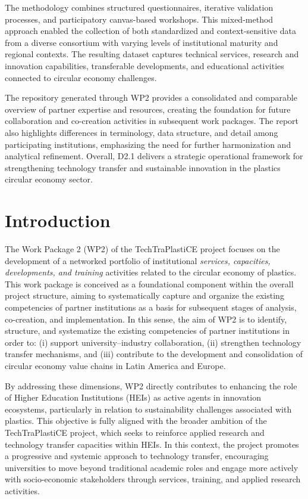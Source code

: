 \documentclass[
  12pt,
  oneside]{book}
\begin{document}
The methodology combines structured questionnaires, iterative validation
processes, and participatory canvas-based workshops. This mixed-method
approach enabled the collection of both standardized and
context-sensitive data from a diverse consortium with varying levels of
institutional maturity and regional contexts. The resulting dataset
captures technical services, research and innovation capabilities,
transferable developments, and educational activities connected to
circular economy challenges.

The repository generated through WP2 provides a consolidated and
comparable overview of partner expertise and resources, creating the
foundation for future collaboration and co-creation activities in
subsequent work packages. The report also highlights differences in
terminology, data structure, and detail among participating
institutions, emphasizing the need for further harmonization and
analytical refinement. Overall, D2.1 delivers a strategic operational
framework for strengthening technology transfer and sustainable
innovation in the plastics circular economy sector.

\chapter{Introduction}\label{introduction}

The Work Package 2 (WP2) of the TechTraPlastiCE project focuses on the
development of a networked portfolio of institutional \emph{services,
capacities, developments, and training} activities related to the
circular economy of plastics. This work package is conceived as a
foundational component within the overall project structure, aiming to
systematically capture and organize the existing competencies of partner
institutions as a basis for subsequent stages of analysis, co-creation,
and implementation. In this sense, the aim of WP2 is to identify,
structure, and systematize the existing competencies of partner
institutions in order to: (i) support university--industry
collaboration, (ii) strengthen technology transfer mechanisms, and (iii)
contribute to the development and consolidation of circular economy
value chains in Latin America and Europe.

By addressing these dimensions, WP2 directly contributes to enhancing
the role of Higher Education Institutions (HEIs) as active agents in
innovation ecosystems, particularly in relation to sustainability
challenges associated with plastics. This objective is fully aligned
with the broader ambition of the TechTraPlastiCE project, which seeks to
reinforce applied research and technology transfer capacities within
HEIs. In this context, the project promotes a progressive and systemic
approach to technology transfer, encouraging universities to move beyond
traditional academic roles and engage more actively with socio-economic
stakeholders through services, training, and applied research
activities.
\end{document}
